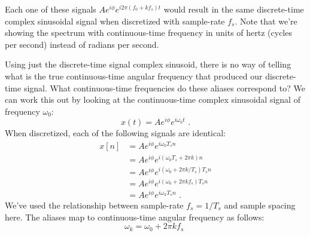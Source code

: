 \begin{marginfigure}[5cm]
  \begin{center}
  \end{center}
  \caption{Each one of these signals $Ae^{i\phi}e^{i2\pi (f_0 + k f_s)t}$
  would result in the same discrete-time complex sinusoidal signal
  when discretized with sample-rate $f_s$. Note that we're showing the
  spectrum with continuous-time frequency in units of hertz (cycles
  per second) instead of radians per second.}
\end{marginfigure}

Using just the discrete-time signal complex sinusoid, there is no way
of telling what is the true continuous-time angular frequency that
produced our discrete-time signal. What continuous-time frequencies do
these aliases correspond to? We can work this out by looking at the
continuous-time complex sinusoidal signal of frequency $\omega_0$:
\begin{equation}
  x(t) = A e^{i\phi} e^{i\omega_0 t}\,\,.
\end{equation}
When discretized, each of the following signals are identical:
\begin{align}
  x[n] & =A e^{i\phi} e^{i \omega_0 T_s n }                \\
       & = A e^{i\phi} e^{i(\omega_0 T_s + 2\pi k) n }     \\
       & = A e^{i\phi} e^{i(\omega_0 + 2\pi k/T_s) T_s n } \\
       & = A e^{i\phi} e^{i(\omega_0 + 2\pi k f_s) T_s n } \\
       & = A e^{i\phi} e^{i \omega_k T_s n } \,\,.
\end{align}
We've used the relationship between sample-rate $f_s=1/T_s$ and sample
spacing here. The aliases map to continuous-time angular frequency as
follows:
\begin{equation}
  \boxed{
    \omega_k = \omega_0 + 2\pi k f_s
  }\,\,
\end{equation}

